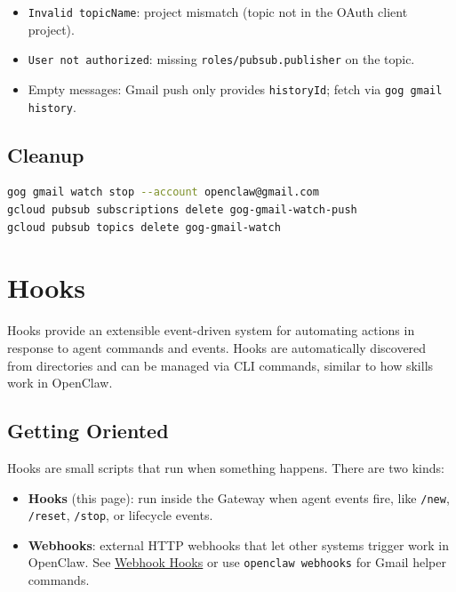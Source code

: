\begin{itemize}
  \item \texttt{Invalid topicName}: project mismatch (topic not in the OAuth client project).
  \item \texttt{User not authorized}: missing \texttt{roles/pubsub.publisher} on the topic.
  \item Empty messages: Gmail push only provides \texttt{historyId}; fetch via \texttt{gog gmail history}.
\end{itemize}


\subsection{Cleanup}


\begin{lstlisting}[language=bash]
gog gmail watch stop --account openclaw@gmail.com
gcloud pubsub subscriptions delete gog-gmail-watch-push
gcloud pubsub topics delete gog-gmail-watch
\end{lstlisting}



\clearpage

\section{Hooks}


Hooks provide an extensible event-driven system for automating actions in response to agent commands and events. Hooks are automatically discovered from directories and can be managed via CLI commands, similar to how skills work in OpenClaw.

\subsection{Getting Oriented}


Hooks are small scripts that run when something happens. There are two kinds:

\begin{itemize}
  \item \textbf{Hooks} (this page): run inside the Gateway when agent events fire, like \texttt{/new}, \texttt{/reset}, \texttt{/stop}, or lifecycle events.
  \item \textbf{Webhooks}: external HTTP webhooks that let other systems trigger work in OpenClaw. See \href{/automation/webhook}{Webhook Hooks} or use \texttt{openclaw webhooks} for Gmail helper commands.
\end{itemize}


